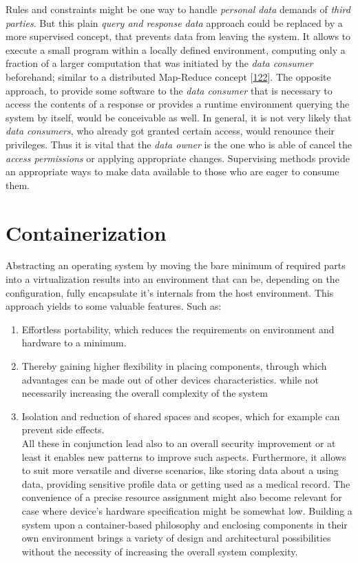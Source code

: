 \documentclass[12pt,english,a4paper,titlepage,cleardoublepage=empty,dottedtoc]{report}
\providecommand{\tightlist}{%
  \setlength{\itemsep}{0pt}\setlength{\parskip}{0pt}}
\begin{document}
Rules and constraints might be one way to handle \emph{personal data}
demands of \emph{third parties}. But this plain \emph{query and response
data} approach could be replaced by a more supervised concept, that
prevents data from leaving the system. It allows to execute a small
program within a locally defined environment, computing only a fraction
of a larger computation that was initiated by the \emph{data consumer}
beforehand; similar to a distributed Map-Reduce concept
{[}\protect\hyperlink{ref-paper_2004_distributed-mapreduce}{122}{]}. The
opposite approach, to provide some software to the \emph{data consumer}
that is necessary to access the contents of a response or provides a
runtime environment querying the system by itself, would be conceivable
as well. In general, it is not very likely that \emph{data consumers},
who already got granted certain access, would renounce their privileges.
Thus it is vital that the \emph{data owner} is the one who is able of
cancel the \emph{access permissions} or applying appropriate changes.
Supervising methods provide an appropriate ways to make data available
to those who are eager to consume them.

\section{Containerization}\label{containerization}

Abstracting an operating system by moving the bare minimum of required
parts into a virtualization results into an environment that can be,
depending on the configuration, fully encapsulate it's internals from
the host environment. This approach yields to some valuable features.
Such as:

\begin{enumerate}
\def\labelenumi{(\Alph{enumi})}
\tightlist
\item
  Effortless portability, which reduces the requirements on environment
  and hardware to a minimum.
\item
  Thereby gaining higher flexibility in placing components, through
  which advantages can be made out of other devices characteristics.
  while not necessarily increasing the overall complexity of the system
\item
  Isolation and reduction of shared spaces and scopes, which for example
  can prevent side effects.\\
  All these in conjunction lead also to an overall security improvement
  or at least it enables new patterns to improve such aspects.
  Furthermore, it allows to suit more versatile and diverse scenarios,
  like storing data about a using data, providing sensitive profile data
  or getting used as a medical record. The convenience of a precise
  resource assignment might also become relevant for case where device's
  hardware specification might be somewhat low. Building a system upon a
  container-based philosophy and enclosing components in their own
  environment brings a variety of design and architectural possibilities
  without the necessity of increasing the overall system complexity.
\end{enumerate}
\end{document}

